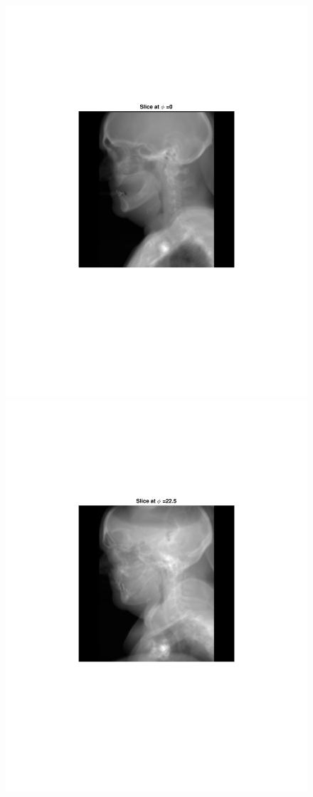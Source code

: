 \documentclass{UCF_ETD}
\begin{document}
\begin{figure}[H]   
\begin{center}
\includegraphics[scale=0.5]{FVR/CompSlice0}
\includegraphics[scale=0.5]{FVR/CompSlice23}

\end{center}
\end{figure}
\end{document}
